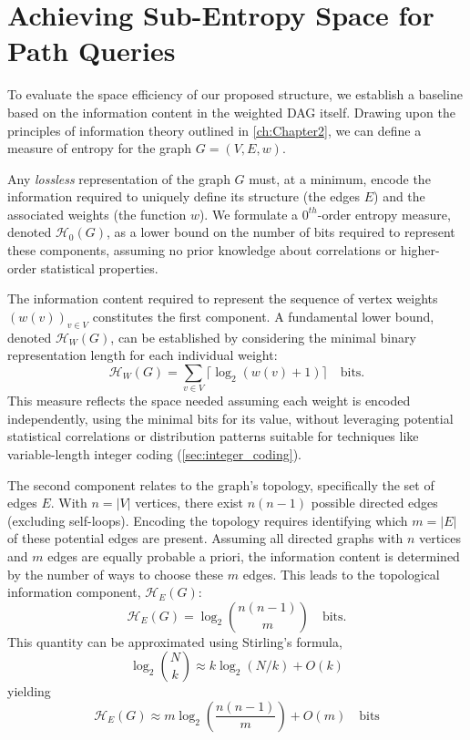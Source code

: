 \section{Achieving Sub-Entropy Space for Path Queries}
\label{sec:below_entropy}

To evaluate the space efficiency of our proposed structure, we establish a baseline based on the information content in the weighted DAG itself. Drawing upon the principles of information theory outlined in \autoref{ch:Chapter2}, we can define a measure of entropy for the graph $G=(V, E, w)$.

Any \emph{lossless} representation of the graph $G$ must, at a minimum, encode the information required to uniquely define its structure (the edges $E$) and the associated weights (the function $w$). We formulate a $0^{th}$-order entropy measure, denoted $\mathcal{H}_0(G)$, as a lower bound on the number of bits required to represent these components, assuming no prior knowledge about correlations or higher-order statistical properties.

The information content required to represent the sequence of vertex weights $(w(v))_{v \in V}$ constitutes the first component. A fundamental lower bound, denoted $\mathcal{H}_W(G)$, can be established by considering the minimal binary representation length for each individual weight:
\[ \mathcal{H}_W(G) = \sum_{v \in V} \lceil \log_2 (w(v)+1) \rceil \quad \text{bits}. \]
This measure reflects the space needed assuming each weight is encoded independently, using the minimal bits for its value, without leveraging potential statistical correlations or distribution patterns suitable for techniques like variable-length integer coding (\autoref{sec:integer_coding}).

The second component relates to the graph's topology, specifically the set of edges $E$. With $n = |V|$ vertices, there exist $n(n-1)$ possible directed edges (excluding self-loops). Encoding the topology requires identifying which $m = |E|$ of these potential edges are present. Assuming all directed graphs with $n$ vertices and $m$ edges are equally probable a priori, the information content is determined by the number of ways to choose these $m$ edges. This leads to the topological information component, $\mathcal{H}_E(G)$:
\[ \mathcal{H}_E(G) = \log_2 \binom{n(n-1)}{m} \quad \text{bits}. \]
This quantity can be approximated using Stirling's formula,
\[\log_2 \binom{N}{k} \approx k \log_2(N/k) + O(k)\]
yielding
\[\mathcal{H}_E(G) \approx m \log_2 \left( \frac{n(n-1)}{m} \right) + O(m) \quad \text{bits}\]

